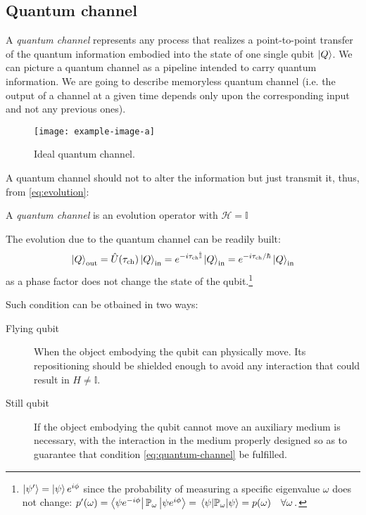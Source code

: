 \subsection{Quantum channel}
A \emph{quantum channel} represents any process that realizes a point-to-point transfer of the quantum information embodied into the state of one single qubit $\ket{Q}$. We can picture a quantum channel as a pipeline intended to carry quantum information. We are going to describe memoryless quantum channel (i.e. the output of a channel at a given time depends only upon the corresponding input and not any previous ones).
\begin{figure}
\centering
\texttt{[image: example-image-a]}
\caption{Ideal quantum channel.}
\label{fig:quantum-channel}
\end{figure}
A quantum channel should not to alter the information but just transmit it, thus, from \ref{eq:evolution}:
\begin{defn}
A \emph{quantum channel} is an evolution operator with $\mathcal{H}=\mathbb{I}$
\end{defn}
The evolution due to the quantum channel can be readily built:
\begin{equation}\label{eq:quantum-channel}
    \ket{Q}_\text{out} = \hat{U}(\tau_\text{ch}) \ket{Q}_\text{in} = e^{-i\tau_\text{ch}\hat{\mathbb{I}}} \ket{Q}_\text{in} = e^{-i\tau_\text{ch}/\hbar} \ket{Q}_\text{in}
\end{equation}
as a phase factor does not change the state of the qubit.\footnote{$\ket{\psi'}= \ket{\psi}e^{i\phi}$ since the probability of measuring a specific eigenvalue $\omega$ does not change: $p'(\omega) = \bra{\psi e^{-i\phi}}\mathbb{P}_\omega\ket{\psi e^{i\phi}} = \expval{\mathbb{P}_\omega}{\psi} = p(\omega) \quad \forall \omega\,.$}

Such condition can be otbained in two ways:
\begin{description}
\item[Flying qubit] When the object embodying the qubit can physically move. Its repositioning should be shielded enough to avoid any interaction that could result in $H \neq \mathbb{I}$.
\item[Still qubit] If the object embodying the qubit cannot move an auxiliary medium is necessary, with the interaction in the medium properly designed so as to guarantee that condition \ref{eq:quantum-channel} be fulfilled.
\end{description}

